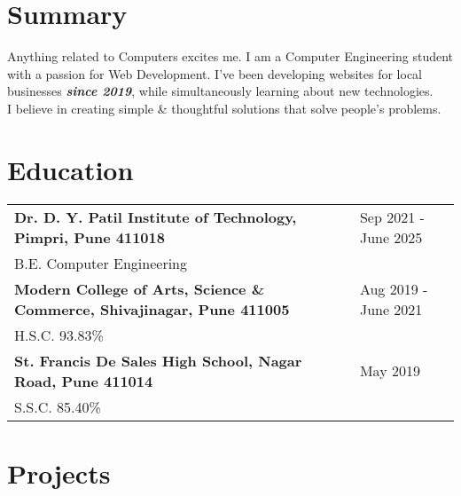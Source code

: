 \documentclass[a4paper,10pt]{article}
\begin{document}
\section{Summary}
Anything related to Computers excites me. I am a Computer Engineering student with a passion for Web Development. I've been developing websites for local businesses \textbf{\textit{since 2019}}, while simultaneously learning about new technologies.\\ I believe in creating simple \& thoughtful solutions that solve people's problems.

\section{Education}
\begin{tabularx}{\linewidth}{@{}l X@{}}	

\textbf{Dr. D. Y. Patil Institute of Technology, Pimpri, Pune 411018} & \hfill 
Sep 2021 - June 2025 \\ \vspace*{2mm}
B.E. Computer Engineering \\ 

\textbf{Modern College of Arts, Science \& Commerce, Shivajinagar, Pune 411005} & \hfill 
Aug 2019 - June 2021 \\ \vspace*{2mm}
H.S.C. 93.83\% \\ 

\textbf{St. Francis De Sales High School, Nagar Road, Pune 411014} & \hfill 
May 2019 \\ 
S.S.C. 85.40\% \\

\end{tabularx}
  
\section{Projects}
\end{document}
